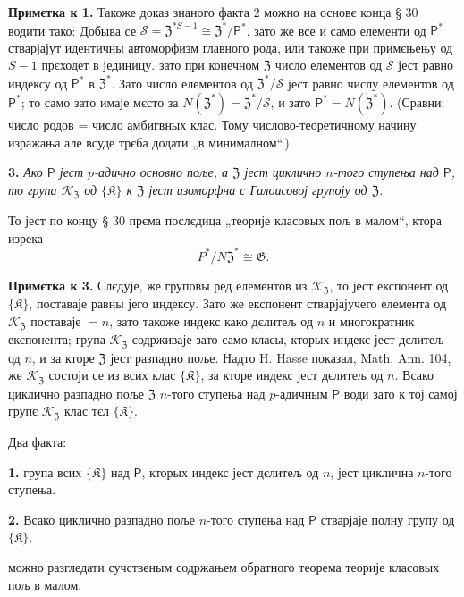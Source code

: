\documentclass[11pt]{article}
\begin{document}
\noindent\textbf{Примєтка к 1.} Такоже доказ знаного факта 2 можно на основє конца § 30 водити тако: Добыва се \(\mathscr S=\mathfrak Z^{*S-1}\cong\mathfrak Z^*/\mathsf{P}^*\), зато же все и само елементи од \(\mathsf{P}^*\) стварјајут идентичны автоморфизм главного рода, или такоже при примєњењу од \(S-1\) прєходет в јединицу. зато при конечном \(\mathfrak Z\) число елементов од \(\mathscr S\) јест равно индексу од \(\mathsf{P}^*\) в \(\mathfrak Z^*\). Зато число елементов од \(\mathfrak Z^*/\mathscr S\) јест равно числу елементов од \(\mathsf{P}^*\); то само зато имаје мєсто за \(N(\mathfrak Z^*)=\mathfrak Z^*/\mathscr S\), и зато \(\mathsf{P}^*=N(\mathfrak Z^*)\). (Сравни: число родов = число амбигвных клас. Тому числово-теоретичному начину изражања але всуде трєба додати „в минималном“.)

\noindent\textbf{3.} \emph{Ако \(\mathsf{P}\) јест \(p\)-адично основно поље, а \(\mathfrak Z\) јест циклично \(n\)-того ступења над \(\mathsf{P}\), то група \(\mathscr K_{\mathfrak Z}\) од \(\{\mathfrak K\}\) к \(\mathfrak Z\) јест изоморфна с Галоисовој групоју од \(\mathfrak Z\).}

То јест по концу § 30 прєма послєдица „теорије класовых пољ в малом“, ктора изрека
\[
P^*/N\mathfrak Z^*\cong\mathfrak G.
\]

\noindent\textbf{Примєтка к 3.} Слєдује, же груповы ред елементов из \(\mathscr K_{\mathfrak Z}\), то јест експонент од \(\{\mathfrak K\}\), поставаје равны јего индексу. Зато же експонент стварјајучего елемента од \(\mathscr K_{\mathfrak Z}\) поставаје \(=n\), зато такоже индекс како дєлитељ од \(n\) и многократник експонента; група \(\mathscr K_{\mathfrak Z}\) содрживаје зато само класы, кторых индекс јест дєлитељ од \(n\), и за кторе \(\mathfrak Z\) јест разпадно поље. Надто H. Hasse показал, Math. Ann. 104, же \(\mathscr K_{\mathfrak Z}\) состоји се из всих клас \(\{\mathfrak K\}\), за кторе индекс јест дєлитељ од \(n\). Всако циклично разпадно поље \(\mathfrak Z\) \(n\)-того ступења над \(p\)-адичным \(\mathsf{P}\) води зато к тој самој групє \(\mathscr K_{\mathfrak Z}\) клас тєл \(\{\mathfrak K\}\).

Два факта:

\noindent\textbf{1.} група всих \(\{\mathfrak K\}\) над \(\mathsf{P}\), кторых индекс јест дєлитељ од \(n\), јест циклична \(n\)-того ступења.

\noindent\textbf{2.} Всако циклично разпадно поље \(n\)-того ступења над \(\mathsf{P}\) стварјаје полну групу од \(\{\mathfrak K\}\).

можно разгледати сучственым содржањем обратного теорема теорије класовых пољ в малом.


\clearpage
\end{document}

